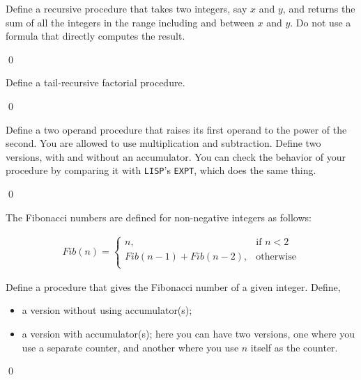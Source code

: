 \documentclass[a4paper,11pt]{article}
\begin{document}
\begin{uexercise}
Define a recursive procedure that takes two integers, say $x$ and $y$, and returns the sum of all the integers in the range including and between $x$ and $y$. Do not use a formula that directly computes the result.

\qed
\end{uexercise}

\begin{uexercise}

Define a tail-recursive factorial procedure.

\qed
\end{uexercise}

\begin{uexercise}
Define a two operand procedure that raises its first operand to the power of the second. You are allowed to use multiplication and subtraction. Define two versions, with and without an accumulator. You can check the behavior of your procedure by comparing it with \Verb+LISP+'s \Verb+EXPT+, which does the same thing. 
 
\qed
\end{uexercise}

\begin{uexercise}

The Fibonacci numbers are defined for non-negative integers as follows:

\begin{align}
Fib(n) =  
\begin{cases}
n, & \text{if }n < 2 \\
Fib(n - 1) + Fib(n-2), & \text{otherwise} \\
\end{cases}
\end{align}

Define a procedure that gives the Fibonacci number of a given integer. Define,

\begin{itemize}
\item a version without using accumulator(s);
\item a version with accumulator(s); here you can have two versions, one where you use a separate counter, and another where you use $n$ itself as the counter.
\end{itemize}

\qed
\end{uexercise}
\end{document}
